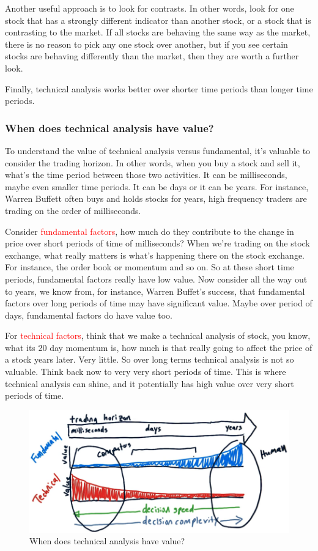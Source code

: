 \documentclass[12pt]{article}
\begin{document}
Another useful approach is to look for contrasts. In other words, look for one stock that has a strongly different indicator than another stock, or a stock that is contrasting to the market. If all stocks are behaving the same way as the market, there is no reason to pick any one stock over another, but if you see certain stocks are behaving differently than the market, then they are worth a further look. 

Finally, technical analysis works better over shorter time periods than longer time periods.

\subsubsection{When does technical analysis have value?}

To understand the value of technical analysis versus fundamental, it's valuable to consider the trading horizon. In other words, when you buy a stock and sell it, what's the time period between those two activities. It can be milliseconds, maybe even smaller time periods. It can be days or it can be years. For instance, Warren Buffett often buys and holds stocks for years, high frequency traders are trading on the order of milliseconds.

Consider \textcolor{red}{fundamental factors}, how much do they contribute to the change in price over short periods of time of milliseconds? When we're trading on the stock exchange, what really matters is what's happening there on the stock exchange. For instance, the order book or momentum and so on. So at these short time periods, fundamental factors really have low value. Now consider all the way out to years, we know from, for instance, Warren Buffet's success, that fundamental factors over long periods of time may have significant value. Maybe over period of days, fundamental factors do have value too. 

For \textcolor{red}{technical factors}, think that we make a technical analysis of stock, you know, what its 20 day momentum is, how much is that really going to affect the price of a stock years later. Very little. So over long terms technical analysis is not so valuable. Think back now to very very short periods of time. This is where technical analysis can shine, and it potentially has high value over very short periods of time. 

\begin{figure}[!ht]
\centering
\includegraphics[scale=0.34]{fig/fig45}
\caption{When does technical analysis have value?}
\end{figure}
\end{document}
